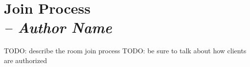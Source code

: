 \chapter{Join Process \\
  \small{\textit{-- Author Name}}
  \label{Chapter::JoinProcess}}


TODO: describe the room join process
TODO: be sure to talk about how clients are authorized